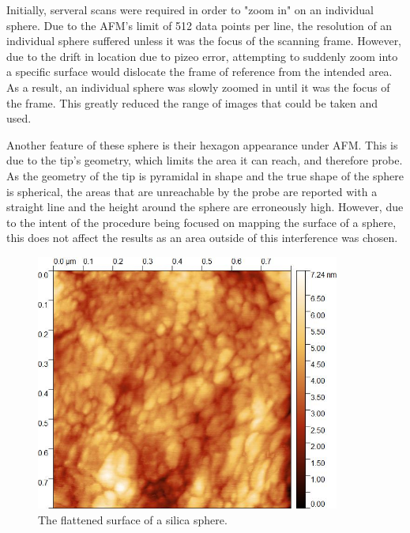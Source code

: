 Initially, serveral scans were required in order to "zoom in" on an individual sphere. Due to the AFM's limit of 512 data points per line, the resolution of an individual sphere suffered unless it was the focus of the scanning frame. However, due to the drift in location due to pizeo error, attempting to suddenly zoom into a specific surface would dislocate the frame of reference from the intended area. As a result, an individual sphere was slowly zoomed in until it was the focus of the frame. This greatly reduced the range of images that could be taken and used.

Another feature of these sphere is their hexagon appearance under AFM. This is due to the tip's geometry, which limits the area it can reach, and therefore probe. As the geometry of the tip is pyramidal in shape and the true shape of the sphere is spherical, the areas that are unreachable by the probe are reported with a straight line and the height around the sphere are erroneously high. However, due to the intent of the procedure being focused on mapping the surface of a sphere, this does not affect the results as an area outside of this interference was chosen.



\begin{figure}[h]     %
        \begin{center}
          \includegraphics[width=100mm]{chapter3/Sphere3.jpg}
\end{center}
\caption{The flattened surface of a silica sphere.}
\label{fig:SiliSph2}                 %
\end{figure}

